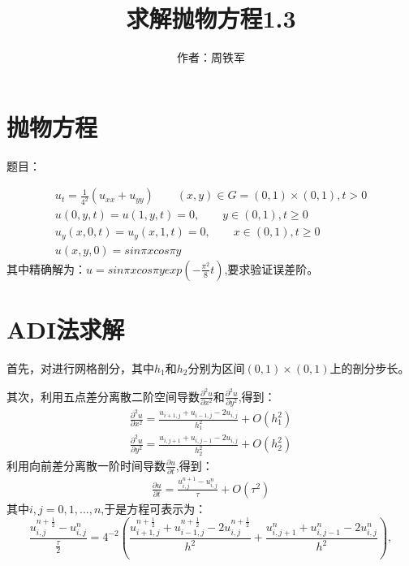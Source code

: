 \documentclass[12pt,a4paper]{article}
\title{求解抛物方程1.3}
\author{作者：周铁军}
\date{\chntoday}
\begin{document}
\maketitle
\newpage
\section{抛物方程}
 题目：
 
 \begin{equation}
  \begin{array}{l}{ u_t = \frac{1}{4^2}(u_{xx}+u_{yy})\qquad (x,y) \in G=(0,1)\times(0,1),t > 0}\\
  {u(0,y,t) = u(1,y,t)=0,\qquad y \in (0,1),t \geq 0 }\\
  {u_y(x,0,t) = u_y(x,1,t)=0,\qquad x \in (0,1),t \geq 0}\\
  {u(x,y,0)=sin{\pi x}cos{\pi y}}\end{array}
 \end{equation}
其中精确解为：$u=sin{\pi x}cos{\pi y}exp(-\frac{\pi^2}{8}t)$,要求验证误差阶。

\section{ADI法求解}
首先，对进行网格剖分，其中$h_1$和$h_2$分别为区间$(0,1)\times(0,1)$上的剖分步长。

其次，利用五点差分离散二阶空间导数$\frac{\partial^2 u}{\partial x^2}$和$\frac{\partial^2 u}{\partial y^2}$,得到：
\begin{equation}
\begin{array}{l}{\frac{\partial^2 u}{\partial x^2} = \frac{u_{i+1,j}+u_{i-1,j}-2u_{i,j}}{h_1^2} + O(h_1^2)}\\
{\frac{\partial^2 u}{\partial y^2} = \frac{u_{i,j+1}+u_{i,j-1}-2u_{i,j}}{h_2^2}+ O(h_2^2)}\end{array}
\end{equation}
利用向前差分离散一阶时间导数$\frac{\partial u}{\partial t}$,得到：
\begin{equation}
\begin{array}{l}{\frac{\partial u}{\partial t} = \frac{u^{n+1}_{i,j}-u^n_{i,j}}{\tau} + O(\tau^2)}\end{array}
\end{equation}
其中$i,j=0,1,...,n$,于是方程可表示为：
$$\frac{u^{n+\frac{1}{2}}_{i,j}-u^n_{i,j}}{\frac{\tau}{2}}=4^{-2}(\frac{u^{n+\frac{1}{2}}_{i+1,j}+u^{n+\frac{1}{2}}_{i-1,j}-2u^{n+\frac{1}{2}}_{i,j}}{h^2}+\frac{u^n_{i,j+1}+u^n_{i,j-1}-2u^n_{i,j}}{h^2}),$$
\end{document}
